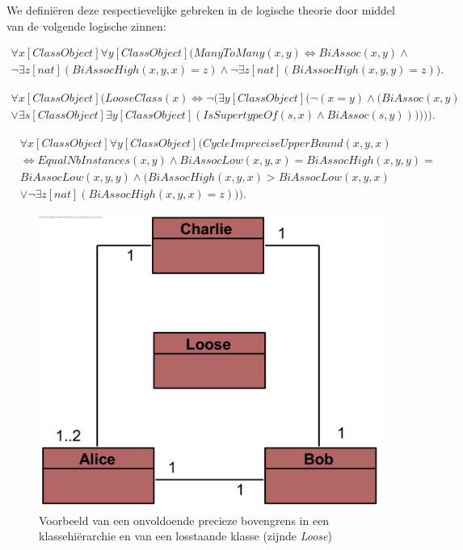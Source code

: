 We defini\"eren deze respectievelijke gebreken in de logische theorie door middel van de volgende logische zinnen:

\begin{align}
	\nonumber \forall{x}[ClassObject]\forall{y}[ClassObject](ManyToMany(x,y) \Leftrightarrow BiAssoc(x,y) \land \\ \lnot\exists{z}[nat](BiAssocHigh(x,y,x) = z) \land \lnot\exists{z}[nat](BiAssocHigh(x,y,y) = z)).\label{form:manytomany}
\end{align}

\begin{align}
	\nonumber \forall{x}[ClassObject](LooseClass(x) \Leftrightarrow \lnot(\exists{y}[ClassObject](\lnot(x = y) \land (BiAssoc(x,y) \\ \lor \exists{s}[ClassObject]\exists{y}[ClassObject](\mathit{IsSupertypeOf}(s,x) \land BiAssoc(s,y)))))).\label{form:loose}
\end{align}

\begin{align}
	&\nonumber\forall{x}[ClassObject]\forall{y}[ClassObject](CycleImpreciseUpperBound(x, y, x) \\ &\nonumber\Leftrightarrow EqualNbInstances(x, y) \land BiAssocLow(x, y, x) = BiAssocHigh(x, y, y) = \\ &\nonumber{}BiAssocLow(x, y, y) \land (BiAssocHigh(x, y, x) > BiAssocLow(x, y, x) \\ &\lor \lnot\exists{z}[nat](BiAssocHigh(x, y, x) = z))).\label{form:imprecise-bound}
\end{align}

\begin{figure}
	\centering
	\includegraphics{chap-kwaliteitsgebrek/cycle.png}
	\caption{Voorbeeld van een onvoldoende precieze bovengrens in een klassehi\"erarchie en van een losstaande klasse (zijnde \textit{Loose})}
	\label{fig:cycle}
\end{figure}

